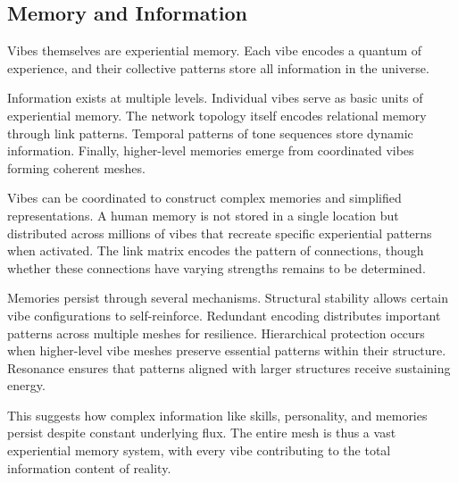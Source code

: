 \subsection{Memory and Information}

Vibes themselves are experiential memory. Each vibe encodes a quantum of experience, and their collective patterns store all information in the universe.

\begin{proposition}
Information exists at multiple levels. Individual vibes serve as basic units of experiential memory. The network topology itself encodes relational memory through link patterns. Temporal patterns of tone sequences store dynamic information. Finally, higher-level memories emerge from coordinated vibes forming coherent meshes.
\end{proposition}

Vibes can be coordinated to construct complex memories and simplified representations. A human memory is not stored in a single location but distributed across millions of vibes that recreate specific experiential patterns when activated. The link matrix encodes the pattern of connections, though whether these connections have varying strengths remains to be determined.

\begin{definition}
Memories persist through several mechanisms. Structural stability allows certain vibe configurations to self-reinforce. Redundant encoding distributes important patterns across multiple meshes for resilience. Hierarchical protection occurs when higher-level vibe meshes preserve essential patterns within their structure. Resonance ensures that patterns aligned with larger structures receive sustaining energy.
\end{definition}

This suggests how complex information like skills, personality, and memories persist despite constant underlying flux. The entire mesh is thus a vast experiential memory system, with every vibe contributing to the total information content of reality.

